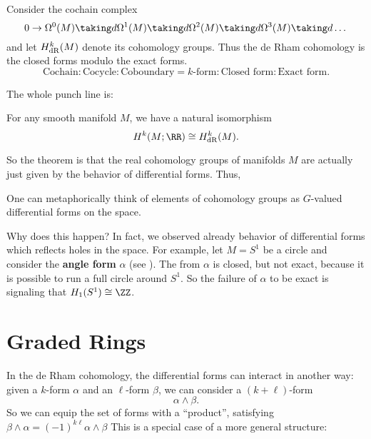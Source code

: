 Consider the cochain complex
\[
	0 \to \Omega^0(M)
	\taking d \Omega^1(M)
	\taking d \Omega^2(M)
	\taking d \Omega^3(M)
	\taking d \dots
\]
and let $H_{\mathrm{dR}}^k(M)$ denote its cohomology groups.
Thus the de Rham cohomology is the closed forms modulo the exact forms.
\[
	\text{Cochain} : \text{Cocycle} : \text{Coboundary}
	= \text{$k$-form} : \text{Closed form} : \text{Exact form}. 
\]

The whole punch line is:
\begin{theorem}
	For any smooth manifold $M$, we have a natural isomorphism
	\[ H^k(M; \RR) \cong \HdR^k(M). \]
\end{theorem}
So the theorem is that the real cohomology groups of manifolds $M$
are actually just given by the behavior of differential forms.
Thus, 
\begin{moral}
	One can metaphorically think of elements of cohomology groups
	as $G$-valued differential forms on the space.
\end{moral}

Why does this happen?
In fact, we observed already behavior of differential
forms which reflects holes in the space.
For example, let $M = S^1$ be a circle
and consider the \textbf{angle form} $\alpha$
(see ).
The from $\alpha$ is closed, but not exact,
because it is possible to run a full circle around $S^1$.
So the failure of $\alpha$ to be exact is signaling
that $H_1(S^1) \cong \ZZ$.

\section{Graded Rings}
In the de Rham cohomology, the differential forms can interact in another way:
given a $k$-form $\alpha$ and an $\ell$-form $\beta$, we can consider
a $(k+\ell)$-form
\[ \alpha \wedge \beta. \]
So we can equip the set of forms with a ``product'', satisfying
$\beta \wedge \alpha = (-1)^{k\ell} \alpha \wedge \beta$
This is a special case of a more general structure:

